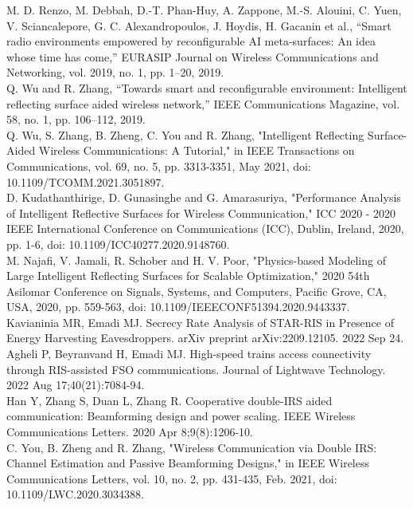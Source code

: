 \documentclass[11pt,twocolumn,twoside]{opticajnl}
\begin{document}
\begin{thebibliography}{1}
M. D. Renzo, M. Debbah, D.-T. Phan-Huy, A. Zappone, M.-S.
Alouini, C. Yuen, V. Sciancalepore, G. C. Alexandropoulos, J. Hoydis,
H. Gacanin et al., “Smart radio environments empowered by reconfigurable AI meta-surfaces: An idea whose time has come,” EURASIP
Journal on Wireless Communications and Networking, vol. 2019, no. 1,
pp. 1–20, 2019.
\\
Q. Wu and R. Zhang, “Towards smart and reconfigurable environment:
Intelligent reflecting surface aided wireless network,” IEEE Communications Magazine, vol. 58, no. 1, pp. 106–112, 2019.
\\
Q. Wu, S. Zhang, B. Zheng, C. You and R. Zhang, "Intelligent Reflecting Surface-Aided Wireless Communications: A Tutorial," in IEEE Transactions on Communications, vol. 69, no. 5, pp. 3313-3351, May 2021, doi: 10.1109/TCOMM.2021.3051897.
\\
D. Kudathanthirige, D. Gunasinghe and G. Amarasuriya, "Performance Analysis of Intelligent Reflective Surfaces for Wireless Communication," ICC 2020 - 2020 IEEE International Conference on Communications (ICC), Dublin, Ireland, 2020, pp. 1-6, doi: 10.1109/ICC40277.2020.9148760.
\\
M. Najafi, V. Jamali, R. Schober and H. V. Poor, "Physics-based Modeling of Large Intelligent Reflecting Surfaces for Scalable Optimization," 2020 54th Asilomar Conference on Signals, Systems, and Computers, Pacific Grove, CA, USA, 2020, pp. 559-563, doi: 10.1109/IEEECONF51394.2020.9443337.
\\
Kavianinia MR, Emadi MJ. Secrecy Rate Analysis of STAR-RIS in Presence of Energy Harvesting Eavesdroppers. arXiv preprint arXiv:2209.12105. 2022 Sep 24.
\\
Agheli P, Beyranvand H, Emadi MJ. High-speed trains access connectivity through RIS-assisted FSO communications. Journal of Lightwave Technology. 2022 Aug 17;40(21):7084-94.
\\
Han Y, Zhang S, Duan L, Zhang R. Cooperative double-IRS aided communication: Beamforming design and power scaling. IEEE Wireless Communications Letters. 2020 Apr 8;9(8):1206-10.
\\
C. You, B. Zheng and R. Zhang, "Wireless Communication via Double IRS: Channel Estimation and Passive Beamforming Designs," in IEEE Wireless Communications Letters, vol. 10, no. 2, pp. 431-435, Feb. 2021, doi: 10.1109/LWC.2020.3034388.
\\

\end{thebibliography}
\end{document}
